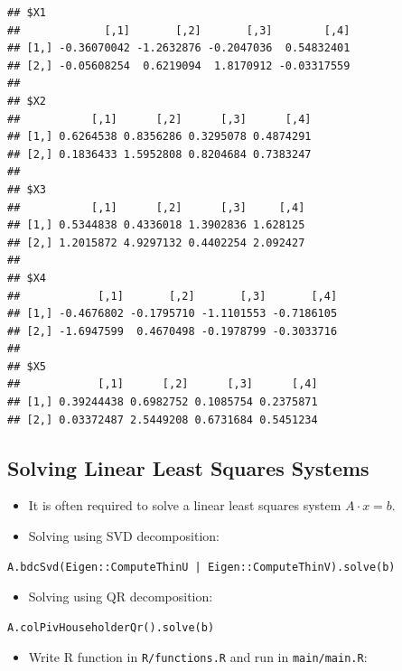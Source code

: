 \documentclass[
]{book}
\providecommand{\tightlist}{%
  \setlength{\itemsep}{0pt}\setlength{\parskip}{0pt}}
\begin{document}
\begin{verbatim}
## $X1
##             [,1]       [,2]       [,3]        [,4]
## [1,] -0.36070042 -1.2632876 -0.2047036  0.54832401
## [2,] -0.05608254  0.6219094  1.8170912 -0.03317559
## 
## $X2
##           [,1]      [,2]      [,3]      [,4]
## [1,] 0.6264538 0.8356286 0.3295078 0.4874291
## [2,] 0.1836433 1.5952808 0.8204684 0.7383247
## 
## $X3
##           [,1]      [,2]      [,3]     [,4]
## [1,] 0.5344838 0.4336018 1.3902836 1.628125
## [2,] 1.2015872 4.9297132 0.4402254 2.092427
## 
## $X4
##            [,1]       [,2]       [,3]       [,4]
## [1,] -0.4676802 -0.1795710 -1.1101553 -0.7186105
## [2,] -1.6947599  0.4670498 -0.1978799 -0.3033716
## 
## $X5
##            [,1]      [,2]      [,3]      [,4]
## [1,] 0.39244438 0.6982752 0.1085754 0.2375871
## [2,] 0.03372487 2.5449208 0.6731684 0.5451234
\end{verbatim}

\hypertarget{solving-linear-least-squares-systems}{%
\subsection{Solving Linear Least Squares Systems}\label{solving-linear-least-squares-systems}}

\begin{itemize}
\tightlist
\item
  It is often required to solve a linear least squares system \(A \cdot x = b\).
\item
  Solving using SVD decomposition:
\end{itemize}

\begin{verbatim}
A.bdcSvd(Eigen::ComputeThinU | Eigen::ComputeThinV).solve(b)
\end{verbatim}

\begin{itemize}
\tightlist
\item
  Solving using QR decomposition:
\end{itemize}

\begin{verbatim}
A.colPivHouseholderQr().solve(b)
\end{verbatim}

\begin{itemize}
\tightlist
\item
  Write R function in \texttt{R/functions.R} and run in \texttt{main/main.R}:
\end{itemize}
\end{document}
